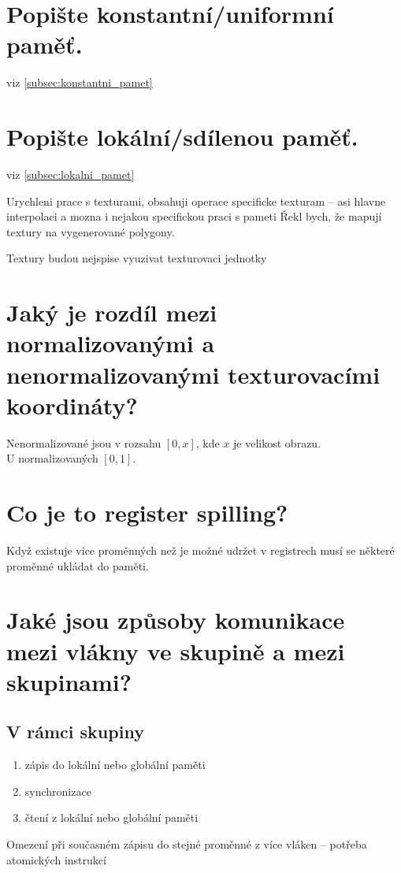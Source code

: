 \section{Popište konstantní/uniformní paměť.}
	viz \ref{subsec:konstantni_pamet}


\section{Popište lokální/sdílenou paměť.}
	viz \ref{subsec:lokalni_pamet}


	Urychleni prace s texturami, obsahuji operace specificke texturam – asi hlavne interpolaci a mozna i nejakou specifickou praci s pameti
	Řekl bych, že mapují textury na vygenerované polygony.


	Textury budou nejspise vyuzivat texturovaci jednotky
	

\section{Jaký je rozdíl mezi normalizovanými a nenormalizovanými texturovacími koordináty?}
	Nenormalizované jsou v rozsahu $[0, x]$, kde $x$ je velikost obrazu.  \\
	U normalizovaných $[0, 1]$.


\section{Co je to register spilling?}
	Když existuje vice proměnných než je možné udržet v registrech musí se některé proměnné ukládat do paměti.


\section{Jaké jsou způsoby komunikace mezi vlákny ve skupině a mezi skupinami?}
	\subsection*{V rámci skupiny}
	\begin{enumerate}
		\setlength\itemsep{0em}
		\item zápis do lokální nebo globální paměti
		\item synchronizace
		\item čtení z lokální nebo globální paměti
	\end{enumerate}
	Omezení při současném zápisu do stejné proměnné z více vláken -- potřeba atomických instrukcí
	
